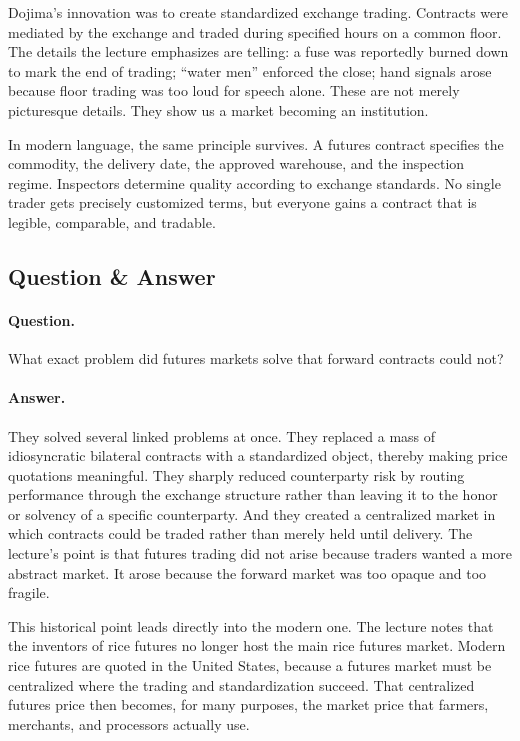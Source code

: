 Dojima's innovation was to create standardized exchange trading. Contracts were mediated by the exchange and traded during specified hours on a common floor. The details the lecture emphasizes are telling: a fuse was reportedly burned down to mark the end of trading; ``water men'' enforced the close; hand signals arose because floor trading was too loud for speech alone. These are not merely picturesque details. They show us a market becoming an institution.

In modern language, the same principle survives. A futures contract specifies the commodity, the delivery date, the approved warehouse, and the inspection regime. Inspectors determine quality according to exchange standards. No single trader gets precisely customized terms, but everyone gains a contract that is legible, comparable, and tradable.

\subsection{Question \& Answer}

\paragraph{Question.} What exact problem did futures markets solve that forward contracts could not?

\paragraph{Answer.} They solved several linked problems at once. They replaced a mass of idiosyncratic bilateral contracts with a standardized object, thereby making price quotations meaningful. They sharply reduced counterparty risk by routing performance through the exchange structure rather than leaving it to the honor or solvency of a specific counterparty. And they created a centralized market in which contracts could be traded rather than merely held until delivery. The lecture's point is that futures trading did not arise because traders wanted a more abstract market. It arose because the forward market was too opaque and too fragile.

This historical point leads directly into the modern one. The lecture notes that the inventors of rice futures no longer host the main rice futures market. Modern rice futures are quoted in the United States, because a futures market must be centralized where the trading and standardization succeed. That centralized futures price then becomes, for many purposes, the market price that farmers, merchants, and processors actually use.

